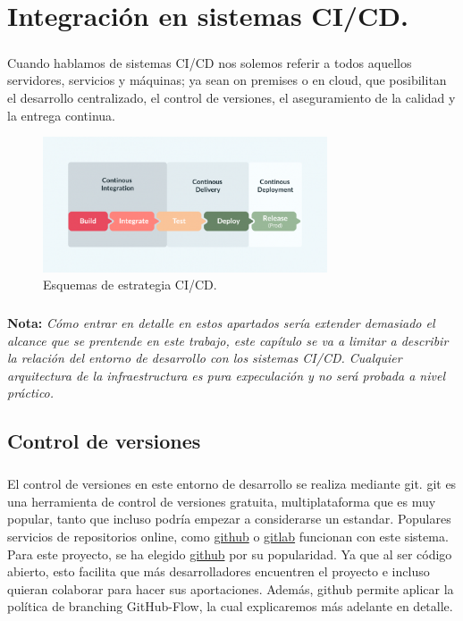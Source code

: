 \chapter{Integración en sistemas CI/CD.}\label{sec:cicd}

\paragraph{}Cuando hablamos de sistemas \gls{CI/CD} nos solemos referir a todos aquellos
servidores, servicios y máquinas; ya sean \gls{on premises} o en cloud, que posibilitan
el desarrollo centralizado, el control de versiones, el aseguramiento de la calidad
y la entrega continua.

\begin{figure}[H]
    \centering
    \includegraphics[width=0.75\textwidth]{imgs/cicd}
    \caption{Esquemas de estrategia CI/CD.}
    \label{imgs:cicd}
\end{figure}


\paragraph{}\textbf{Nota: }\emph{Cómo entrar en detalle en estos apartados sería extender
demasiado el alcance que se prentende en este trabajo, este capítulo se va a limitar a
describir la relación del entorno de desarrollo con los sistemas \gls{CI/CD}. Cualquier
arquitectura de la infraestructura es pura expeculación y no será probada a nivel práctico.}

\section{Control de versiones}

\paragraph{}El control de versiones en este entorno de desarrollo se realiza mediante
\gls{git}. \Gls{git} es una herramienta de control de versiones gratuita, multiplataforma que
es muy popular, tanto que incluso podría empezar a considerarse un estandar. Populares
servicios de repositorios online, como \href{github.com}{github} o \href{gitlab.com}{gitlab}
funcionan con este sistema. Para este proyecto, se ha elegido \href{github.com}{github}
por su popularidad. Ya que al ser código abierto, esto facilita que más desarrolladores
encuentren el proyecto e incluso quieran colaborar para hacer sus aportaciones. Además,
github permite aplicar la política de branching GitHub-Flow, la cual explicaremos más
adelante en detalle.

